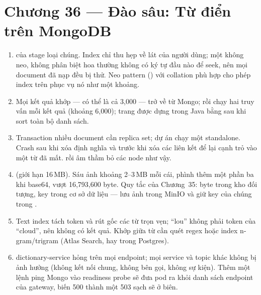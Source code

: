 \section*{Chương 36 --- Đào sâu: Từ điển trên MongoDB}
\begin{enumerate}
  \item {} của stage  loại chúng. Index
   chỉ thu hẹp về lát của người dùng; một
   không neo, không phân biệt hoa thường không có ký tự
  đầu nào để seek, nên mọi document đã nạp đều bị thử. Neo pattern
  () với collation phù hợp cho phép index trên
   phục vụ nó như một khoảng.
  \item Mọi kết quả khớp --- có thể là cả 3{,}000 --- trở về từ Mongo;
   rồi chạy hai truy vấn  mỗi kết
  quả (khoảng 6{,}000); trang được dựng trong Java bằng 
  sau khi sort toàn bộ danh sách.
  \item Transaction nhiều document cần replica set; dự án chạy một
   standalone. Crash sau khi xóa định nghĩa và trước khi
  xóa các liên kết để lại cạnh trỏ vào một từ đã mất.
   rồi
   âm thầm bỏ các node như vậy.
  \item {} (giới hạn 16\,MB). Sáu
  ảnh khoảng 2--3\,MB mỗi cái, phình thêm một phần ba khi base64, vượt
  16{,}793{,}600 byte. Quy tắc của Chương~35: byte trong kho đối tượng,
  key trong cơ sở dữ liệu --- lưu ảnh trong MinIO và giữ key của chúng
  trong .
  \item Text index tách token và rút gốc các từ trọn vẹn; ``lou'' không
  phải token của ``cloud'', nên không có kết quả. Khớp giữa từ cần quét
  regex hoặc index n-gram/trigram (Atlas Search, hay 
  trong Postgres).
  \item dictionary-service hỏng trên mọi endpoint; mọi service và topic
  khác không bị ảnh hưởng (không kết nối chung, không bên gọi, không sự
  kiện). Thêm một lệnh ping Mongo vào readiness probe sẽ đưa pod ra
  khỏi danh sách endpoint của gateway, biến 500 thành một 503 sạch sẽ ở
  biên.
\end{enumerate}

